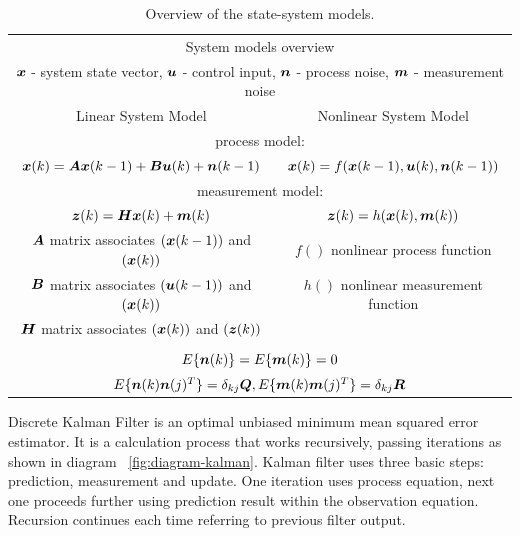 \begin{table}
\centering
	\caption{Overview of the state-system models.}
	\label{tab:system}
\begin{tabular}{cc}
\toprule
\multicolumn{2}{c}{System models overview} \\
\multicolumn{2}{c}{$\boldsymbol{x}$ - system state vector, $\boldsymbol{u}$ - control input, $\boldsymbol{n}$ - process noise, $\boldsymbol{m}$ - measurement noise} \\
\midrule
\multirow{1}{*}{Linear System Model}  &  \multirow{1}{*}{Nonlinear System Model} \\
\multicolumn{2}{c}{process model:} \\
\multirow{2}{*}{$\boldsymbol{x}(k) = \boldsymbol{A}\boldsymbol{x}(k-1)+\boldsymbol{B}\boldsymbol{u}(k)+\boldsymbol{n}(k-1)$} 
									& \multirow{2}{*}{$\boldsymbol{x}(k) = f(\boldsymbol{x}(k-1),\boldsymbol{u}(k),\boldsymbol{n}(k-1))$} \\ \\
\multicolumn{2}{c}{measurement model:} \\
\multirow{2}{*}{$\boldsymbol{z}(k) = \boldsymbol{H}\boldsymbol{x}(k)+\boldsymbol{m}(k)$} 
									& \multirow{2}{*}{$\boldsymbol{z}(k) = h(\boldsymbol{x}(k),\boldsymbol{m}(k))$} \\ \\
\bottomrule
$\boldsymbol{A}$ matrix associates $(\boldsymbol{x}(k-1))$ and $(\boldsymbol{x}(k))$ & $f()$ nonlinear process function \\
$\boldsymbol{B}$ matrix associates $(\boldsymbol{u}(k-1))$ and $(\boldsymbol{x}(k))$ & $h()$ nonlinear measurement function \\
$\boldsymbol{H}$ matrix associates $(\boldsymbol{x}(k))$   and $(\boldsymbol{z}(k))$ &   \\
\\
\multicolumn{2}{c}{$E\lbrace \boldsymbol{n}(k) \rbrace = E\lbrace \boldsymbol{m}(k) \rbrace = 0$} \\ 
\multicolumn{2}{c}{$E\lbrace \boldsymbol{n}(k) \boldsymbol{n}(j)^{T} \rbrace =  \delta_{kj} \boldsymbol{Q}, E\lbrace \boldsymbol{m}(k) \boldsymbol{m}(j)^{T} \rbrace = \delta_{kj} \boldsymbol{R}$} 
\end{tabular} 
\end{table}

Discrete Kalman Filter is an optimal unbiased minimum mean squared error estimator. It is a calculation process that works recursively, passing iterations as shown in diagram ~\ref{fig:diagram-kalman}. Kalman filter uses three basic steps: prediction, measurement and update. One iteration uses process equation, next one proceeds further using prediction result within the observation equation. Recursion continues each time referring to previous filter output.

